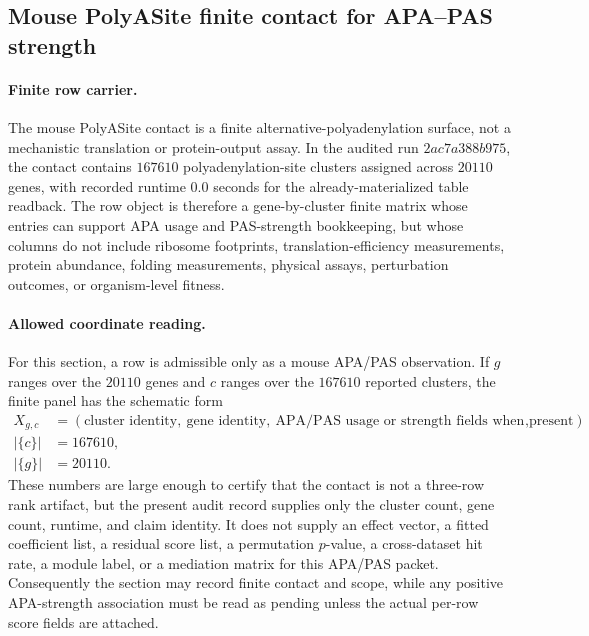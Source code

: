 \subsection{Mouse PolyASite finite contact for APA--PAS strength}\label{sec:bioreality-mouse-polyasite-apa-pas-strength}

\paragraph{Finite row carrier.}
The mouse PolyASite contact is a finite alternative-polyadenylation surface, not a mechanistic translation or protein-output assay.  In the audited run $2ac7a388b975$, the contact contains $167610$ polyadenylation-site clusters assigned across $20110$ genes, with recorded runtime $0.0$ seconds for the already-materialized table readback.  The row object is therefore a gene-by-cluster finite matrix whose entries can support APA usage and PAS-strength bookkeeping, but whose columns do not include ribosome footprints, translation-efficiency measurements, protein abundance, folding measurements, physical assays, perturbation outcomes, or organism-level fitness.

\paragraph{Allowed coordinate reading.}
For this section, a row is admissible only as a mouse APA/PAS observation.  If $g$ ranges over the $20110$ genes and $c$ ranges over the $167610$ reported clusters, the finite panel has the schematic form
$$
\begin{aligned}
  X_{g,c} &= (\text{cluster identity},\ \text{gene identity},\ \text{APA/PAS usage or strength fields when present}),\\
  |\{c\}| &= 167610,\\
  |\{g\}| &= 20110.
\end{aligned}
$$
These numbers are large enough to certify that the contact is not a three-row rank artifact, but the present audit record supplies only the cluster count, gene count, runtime, and claim identity.  It does not supply an effect vector, a fitted coefficient list, a residual score list, a permutation $p$-value, a cross-dataset hit rate, a module label, or a mediation matrix for this APA/PAS packet.  Consequently the section may record finite contact and scope, while any positive APA-strength association must be read as pending unless the actual per-row score fields are attached.

